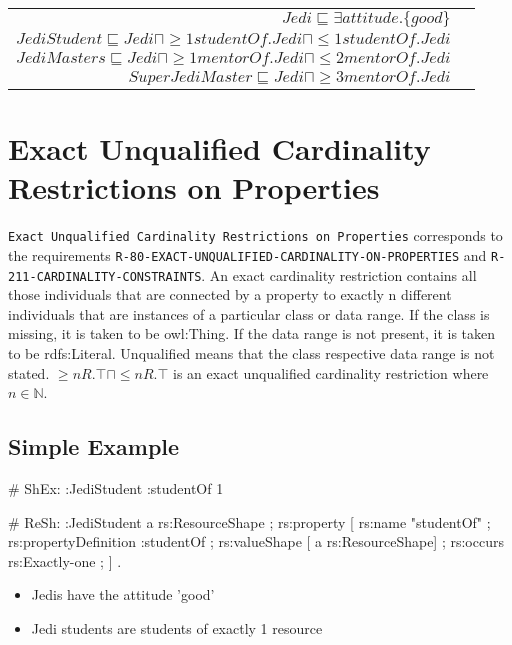\documentclass{llncs}
\newcommand{\ms}[1]{\texttt{#1}}
\newenvironment{DL}{
  \vspace{0cm}
	\begin{center}
  \begin{tabular}{r l}

}{
  \end{tabular}
	\end{center}
}
\newcommand{\tb}[1]{\todo[size=\small, color=blue!40]{\textbf{Thomas:} #1}}
\begin{document}
\begin{DL}
$Jedi \sqsubseteq \exists attitude.\{good\} $\\
$JediStudent \sqsubseteq Jedi \sqcap \geq1 studentOf.Jedi \sqcap \leq1 studentOf.Jedi$ \\
$JediMasters \sqsubseteq Jedi \sqcap \geq1 mentorOf.Jedi \sqcap \leq2 mentorOf.Jedi $\\
$SuperJediMaster \sqsubseteq Jedi \sqcap  \geq3 mentorOf.Jedi $
\end{DL}

\section{Exact Unqualified Cardinality Restrictions on Properties}

\ms{Exact Unqualified Cardinality Restrictions on Properties} corresponds to the requirements
\ms{R-80-EXACT-UNQUALIFIED-CARDINALITY-ON-PROPERTIES} and
\ms{R-211-CARDINALITY-CONSTRAINTS}.
An exact cardinality restriction contains all those individuals that are connected by a property to exactly n different individuals that are instances of a particular class or data range. 
If the class is missing, it is taken to be owl:Thing. 
If the data range is not present, it is taken to be rdfs:Literal.
Unqualified means that the class respective data range is not stated. 
$\geq n R. \top \sqcap \leq n R. \top $ is an exact unqualified cardinality restriction where $n \in \mathbb{N}$.

\subsection{Simple Example}


\begin{ex}
# ShEx:
:JediStudent {
    :studentOf {}{1} }
\end{ex}

\begin{ex}
# ReSh:
:JediStudent a rs:ResourceShape ;
    rs:property [
        rs:name "studentOf" ;
        rs:propertyDefinition :studentOf ;
        rs:valueShape [ a rs:ResourceShape] ;
        rs:occurs rs:Exactly-one ; ] .
\end{ex}

\begin{itemize}
	\item Jedis have the attitude 'good'
	\item Jedi students are students of exactly 1 resource
\end{itemize}
\end{document}
